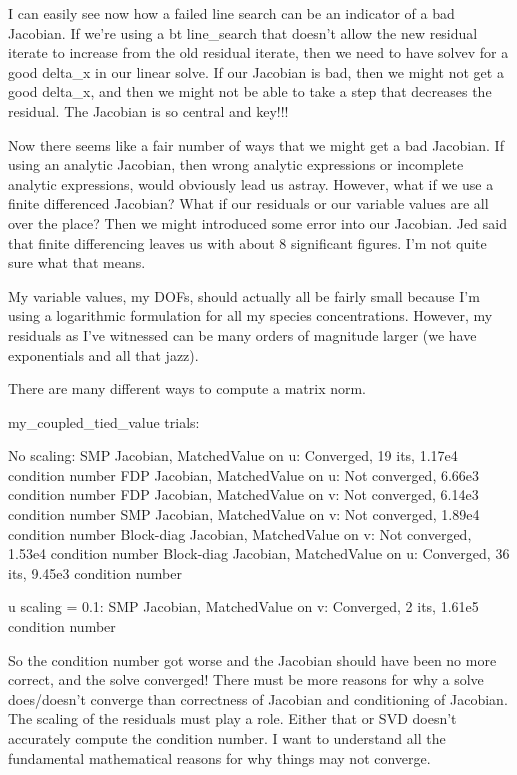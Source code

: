 {I can easily see now how a failed line search can be an indicator of a bad Jacobian. If we're using a bt line_search that doesn't allow the new residual iterate to increase from the old residual iterate, then we need to have solvev for a good delta_x in our linear solve. If our Jacobian is bad, then we might not get a good delta_x, and then we might not be able to take a step that decreases the residual. The Jacobian is so central and key!!!

Now there seems like a fair number of ways that we might get a bad Jacobian. If using an analytic Jacobian, then wrong analytic expressions or incomplete analytic expressions, would obviously lead us astray. However, what if we use a finite differenced Jacobian? What if our residuals or our variable values are all over the place? Then we might introduced some error into our Jacobian. Jed said that finite differencing leaves us with about 8 significant figures. I'm not quite sure what that means.

My variable values, my DOFs, should actually all be fairly small because I'm using a logarithmic formulation for all my species concentrations. However, my residuals as I've witnessed can be many orders of magnitude larger (we have exponentials and all that jazz).

There are many different ways to compute a matrix norm.

my_coupled_tied_value trials:

No scaling:
SMP Jacobian, MatchedValue on u: Converged, 19 its, 1.17e4 condition number
FDP Jacobian, MatchedValue on u: Not converged, 6.66e3 condition number
FDP Jacobian, MatchedValue on v: Not converged, 6.14e3 condition number
SMP Jacobian, MatchedValue on v: Not converged, 1.89e4 condition number
Block-diag Jacobian, MatchedValue on v: Not converged, 1.53e4 condition number
Block-diag Jacobian, MatchedValue on u: Converged, 36 its, 9.45e3 condition number

u scaling = 0.1:
SMP Jacobian, MatchedValue on v: Converged, 2 its, 1.61e5 condition number

So the condition number got worse and the Jacobian should have been no more correct, and the solve converged! There must be more reasons for why a solve does/doesn't converge than correctness of Jacobian and conditioning of Jacobian. The scaling of the residuals must play a role. Either that or SVD doesn't accurately compute the condition number. I want to understand all the fundamental mathematical reasons for why things may not converge.

}
